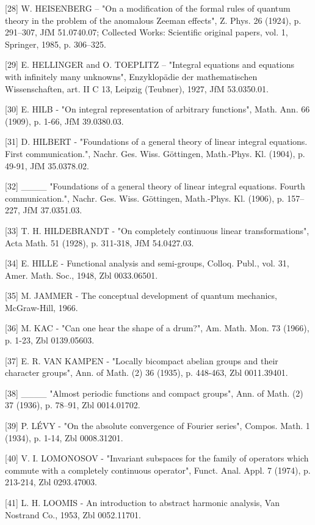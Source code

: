 {[}28{]} W. HEISENBERG -- "On a modification of the formal rules of quantum theory in the problem of the anomalous Zeeman effects", Z. Phys. 26 (1924), p. 291--307, JfM 51.0740.07; Collected Works: Scientific original papers, vol. 1, Springer, 1985, p. 306--325.

{[}29{]} E. HELLINGER and O. TOEPLITZ -- "Integral equations and equations with infinitely many unknowns", Enzyklopädie der mathematischen Wissenschaften, art. II C 13, Leipzig (Teubner), 1927, JfM 53.0350.01.

{[}30{]} E. HILB - "On integral representation of arbitrary functions", Math. Ann. 66 (1909), p. 1-66, JfM 39.0380.03.

{[}31{]} D. HILBERT - "Foundations of a general theory of linear integral equations. First communication.", Nachr. Ges. Wiss. Göttingen, Math.-Phys. Kl. (1904), p. 49-91, JfM 35.0378.02.

{[}32{]} \_\_\_\_ "Foundations of a general theory of linear integral equations. Fourth communication.", Nachr. Ges. Wiss. Göttingen, Math.-Phys. Kl. (1906), p. 157--227, JfM 37.0351.03.

{[}33{]} T. H. HILDEBRANDT - "On completely continuous linear transformations", Acta Math. 51 (1928), p. 311-318, JfM 54.0427.03.

{[}34{]} E. HILLE - Functional analysis and semi-groups, Colloq. Publ., vol. 31, Amer. Math. Soc., 1948, Zbl 0033.06501.

{[}35{]} M. JAMMER - The conceptual development of quantum mechanics, McGraw-Hill, 1966.

{[}36{]} M. KAC - "Can one hear the shape of a drum?", Am. Math. Mon. 73 (1966), p. 1-23, Zbl 0139.05603.

{[}37{]} E. R. VAN KAMPEN - "Locally bicompact abelian groups and their character groups", Ann. of Math. (2) 36 (1935), p. 448-463, Zbl 0011.39401.

{[}38{]} \_\_\_\_ "Almost periodic functions and compact groups", Ann. of Math. (2) 37 (1936), p. 78--91, Zbl 0014.01702.

{[}39{]} P. LÉVY - "On the absolute convergence of Fourier series", Compos. Math. 1 (1934), p. 1-14, Zbl 0008.31201.

{[}40{]} V. I. LOMONOSOV - "Invariant subspaces for the family of operators which commute with a completely continuous operator", Funct. Anal. Appl. 7 (1974), p. 213-214, Zbl 0293.47003.

{[}41{]} L. H. LOOMIS - An introduction to abstract harmonic analysis, Van Nostrand Co., 1953, Zbl 0052.11701.

